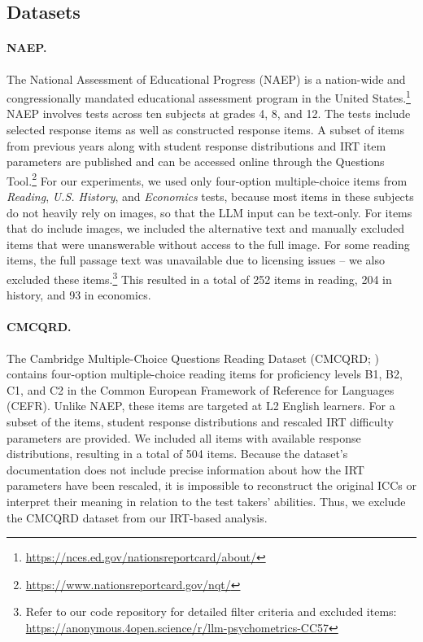 \documentclass[11pt]{article}
\begin{document}
\subsection{Datasets}
\label{sec:experiment:datasets}

\paragraph{NAEP.}

The National Assessment of Educational Progress (NAEP) is a nation-wide and congressionally mandated educational assessment program in the United States.\footnote{\url{https://nces.ed.gov/nationsreportcard/about/}} NAEP involves tests across ten subjects at grades 4, 8, and 12. The tests include selected response items as well as constructed response items. A subset of items from previous years along with student response distributions and IRT item parameters are published and can be accessed online through the Questions Tool.\footnote{\url{https://www.nationsreportcard.gov/nqt/}} For our experiments, we used only four-option multiple-choice items from \emph{Reading}, \emph{U.S. History}, and \emph{Economics} tests, because most items in these subjects do not heavily rely on images, so that the LLM input can be text-only. For items that do include images, we included the alternative text and manually excluded items that were unanswerable without access to the full image. For some reading items, the full passage text was unavailable due to licensing issues -- we also excluded these items.\footnote{Refer to our code repository for detailed filter criteria and excluded items: \url{https://anonymous.4open.science/r/llm-psychometrics-CC57}} This resulted in a total of 252 items in reading, 204 in history, and 93 in economics.

\paragraph{CMCQRD.}

The Cambridge Multiple-Choice Questions Reading Dataset (CMCQRD; \citealp{Mullooly2023}) contains four-option multiple-choice reading items for proficiency levels B1, B2, C1, and C2 in the Common European Framework of Reference for Languages (CEFR). Unlike NAEP, these items are targeted at L2 English learners. For a subset of the items, student response distributions and rescaled IRT difficulty parameters are provided. We included all items with available response distributions, resulting in a total of 504 items. Because the dataset's documentation does not include precise information about how the IRT parameters have been rescaled, it is impossible to reconstruct the original ICCs or interpret their meaning in relation to the test takers' abilities. Thus, we exclude the CMCQRD dataset from our IRT-based analysis.
\end{document}
